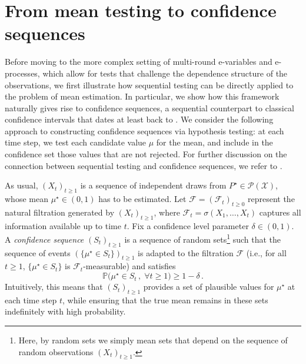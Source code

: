 \documentclass[3p, authoryear, 10pt]{elsarticle}%
\newcommand{\F}{\mathcal F}
\newcommand{\Pp}{\mathbb P}
\newcommand{\PR}{\mathcal P}
\newcommand{\X}{\mathcal X}
\begin{document}
\section{From mean testing to confidence sequences}\label{sec:conf}
Before moving to the more complex setting of multi-round e-variables and e-processes, which allow for tests that challenge the dependence structure of the observations, we first illustrate how sequential testing can be directly applied to the problem of mean estimation. In particular, we show how this framework naturally gives rise to confidence sequences, a sequential counterpart to classical confidence intervals that dates at least back to \cite{darling67confidence}. We consider the following approach to constructing confidence sequences via hypothesis testing: at each time step, we  test  each candidate value $\mu$ for the mean, and include in the confidence set those values that are not rejected. For further discussion on the connection between sequential testing and confidence sequences, we refer  to \cite{ramdas2022admissible}. 

As usual, $(X_t)_{t\geq 1}$ is a sequence of independent draws from $P^\star\in\PR(\X)$, whose mean $\mu^\star\in(0,1)$ has to be estimated. Let $\mathcal{F} = (\F_t)_{t\geq 0}$ represent the natural filtration generated by $(X_t)_{t\geq 1}$, where $\F_t = \sigma(X_1, \dots, X_t)$ captures all information available up to time $t$. Fix a confidence level parameter $\delta \in (0,1)$. A \emph{confidence sequence} $(S_t)_{t\geq 1}$ is a sequence of random sets\footnote{Here, by random sets we simply mean sets that depend on the sequence of random observations $(X_t)_{t\geq 1}$.} such that the sequence of events $(\{\mu^\star\in S_t\})_{t\geq 1}$ is adapted  to the filtration $\F$ (i.e., for all $t\geq 1$, $\{\mu^\star\in S_t\}$ is $\F_{t}$-measurable) and satisfies  $$\Pp\big(\mu^\star\in S_t\,,\;\forall t\geq 1\big) \geq 1-\delta\,.$$
Intuitively, this means that $(S_t)_{t\geq 1}$ provides a set of plausible values for $\mu^\star$ at each time step $t$, while ensuring that the true mean remains in these sets indefinitely with high probability.
\end{document}
